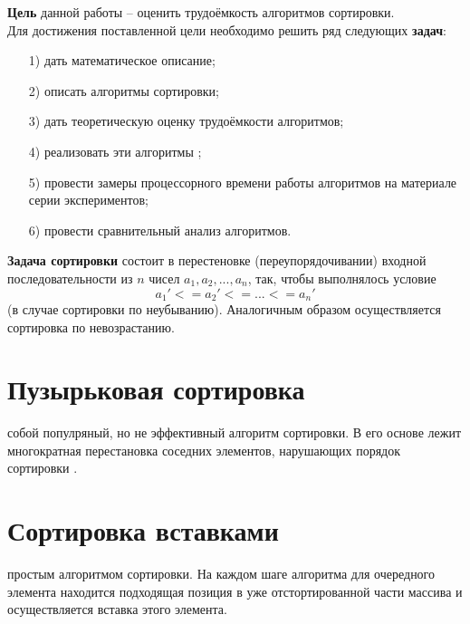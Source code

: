 \textbf{Цель} данной работы – оценить трудоёмкость алгоритмов сортировки.\\

Для достижения поставленной цели необходимо решить ряд следующих \textbf{задач}:
\begin{enumerate}
\item[1)] дать математическое описание;
\item[2)] описать алгоритмы сортировки;
\item[3)] дать теоретическую оценку трудоёмкости алгоритмов;
\item[4)] реализовать эти алгоритмы ;
\item[5)] провести замеры процессорного времени работы алгоритмов на материале серии экспериментов;
\item[6)] провести сравнительный анализ алгоритмов.
\end{enumerate}

\textbf{Задача сортировки} состоит в перестеновке (переупорядочивании) входной последовательности из $n$ чисел ${a_1, a_2, ..., a_n}$, так, чтобы выполнялось условие
\begin{equation}
	a_1' <= a_2' <= ... <= a_n'
\end{equation} (в случае сортировки по неубыванию). Аналогичным образом осуществляется сортировка по невозрастанию.

\section{Пузырьковая сортировка}
 собой популряный, но не эффективный алгоритм сортировки. В его основе лежит многократная перестановка соседних элементов, нарушающих порядок сортировки \cite{Kormen}.

\section{Сортировка вставками}
 простым алгоритмом сортировки. На каждом шаге алгоритма для очередного элемента находится подходящая позиция в уже отстортированной части массива и осуществляется вставка этого элемента. 